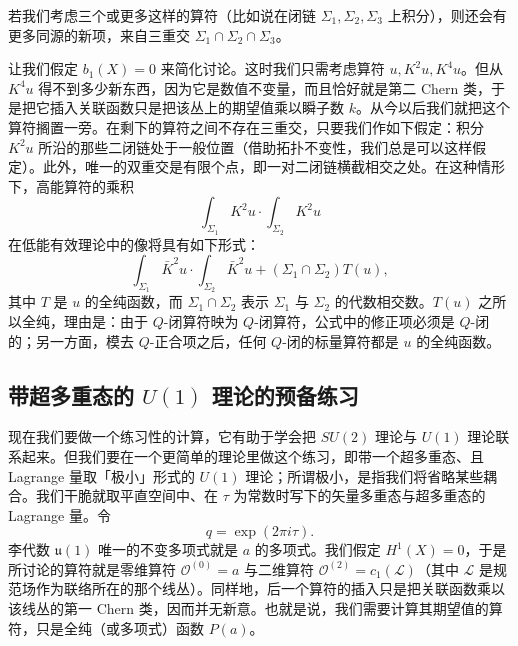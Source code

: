 若我们考虑三个或更多这样的算符（比如说在闭链 $\Sigma_1,\Sigma_2,\Sigma_3$ 上积分），则还会有更多同源的新项，来自三重交 $\Sigma_1\cap\Sigma_2\cap\Sigma_3$。

让我们假定 $b_1(X)=0$ 来简化讨论。这时我们只需考虑算符 $u,K^2u,K^4u$。但从 $K^4u$ 得不到多少新东西，因为它是数值不变量，而且恰好就是第二 Chern 类，于是把它插入关联函数只是把该丛上的期望值乘以瞬子数 $k$。从今以后我们就把这个算符搁置一旁。在剩下的算符之间不存在三重交，只要我们作如下假定：积分 $K^2u$ 所沿的那些二闭链处于一般位置（借助拓扑不变性，我们总是可以这样假定）。此外，唯一的双重交是有限个点，即一对二闭链横截相交之处。在这种情形下，高能算符的乘积
\[
\int_{\Sigma_1}K^2u\cdot\int_{\Sigma_2}K^2u
\]
在低能有效理论中的像将具有如下形式：
\[
\int_{\Sigma_1}\bar K^2u\cdot\int_{\Sigma_2}\bar K^2u+(\Sigma_1\cap\Sigma_2)T(u),
\]
其中 $T$ 是 $u$ 的全纯函数，而 $\Sigma_1\cap\Sigma_2$ 表示 $\Sigma_1$ 与 $\Sigma_2$ 的代数相交数。$T(u)$ 之所以全纯，理由是：由于 $Q$-闭算符映为 $Q$-闭算符，公式中的修正项必须是 $Q$-闭的；另一方面，模去 $Q$-正合项之后，任何 $Q$-闭的标量算符都是 $u$ 的全纯函数。


\subsection{带超多重态的 $U(1)$ 理论的预备练习}

现在我们要做一个练习性的计算，它有助于学会把 $SU(2)$ 理论与 $U(1)$ 理论联系起来。但我们要在一个更简单的理论里做这个练习，即带一个超多重态、且 Lagrange 量取「极小」形式的 $U(1)$ 理论；所谓极小，是指我们将省略某些耦合。我们干脆就取平直空间中、在 $\tau$ 为常数时写下的矢量多重态与超多重态的 Lagrange 量。令
\[
q=\exp(2\pi i\tau).
\]
李代数 $\mathfrak{u}(1)$ 唯一的不变多项式就是 $a$ 的多项式。我们假定 $H^1(X)=0$，于是所讨论的算符就是零维算符 $\mathcal{O}^{(0)}=a$ 与二维算符 $\mathcal{O}^{(2)}=c_1(\mathcal{L})$（其中 $\mathcal{L}$ 是规范场作为联络所在的那个线丛）。同样地，后一个算符的插入只是把关联函数乘以该线丛的第一 Chern 类，因而并无新意。也就是说，我们需要计算其期望值的算符，只是全纯（或多项式）函数 $P(a)$。

